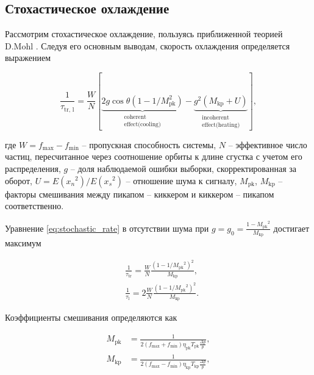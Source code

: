 	\subsection{Стохастическое охлаждение}

\par Рассмотрим стохастическое охлаждение, пользуясь приближенной теорией D.Mohl \cite{mohl:stochastic, mohl:stochastic2}. Следуя его основным выводам, скорость охлаждения определяется выражением		
	
\begin{equation} 
\frac{1}{\tau_{\text{tr, l}}}=\frac{W}{N}[\underbrace{2 g \cos \theta\left(1-1 / M_{\textrm{pk}}^2\right)}_{\begin{array}{c}
\text {coherent} \\
\text {effect(cooling)}
\end{array}}-\underbrace{g^2\left(M_{\textrm{kp}}+U\right)}_{\begin{array}{c}
\text {incoherent} \\
\text {effect(heating)}
\end{array}}],
\label{eq:stochastic_rate}
\end{equation}	

\noindent где $W=f_{\text{max}}-f_{\text{min}}$ -- пропускная способность системы, $N$ -- эффективное число частиц, пересчитанное через соотношение орбиты к длине сгустка с учетом его распределения, $g$ -- доля наблюдаемой ошибки выборки, скорректированная за оборот, $U=E({x_n}^2)/E({x_s}^2)$ -- отношение шума к сигналу, $M_{\textrm{pk}}$, $M_{\textrm{kp}}$ -- факторы смешивания между пикапом -- киккером и киккером -- пикапом соответственно.

\noindent Уравнение \ref{eq:stochastic_rate} в отсутствии шума при $g=g_0={\frac{1-{M_{\textrm{pk}}}^2}{M_{\textrm{kp}}}}$ достигает максимум

\begin{equation}
\begin{aligned}
& \frac{1}{\tau_{\textrm{tr}}}=\frac{W}{N} \frac{\left(1-1 / {M_{\textrm{pk}}}^2\right)^2}{M_{\textrm{kp}}}, \\
& \frac{1}{\tau_{\textrm{l}}}=2 \frac{W}{N} \frac{\left(1-1 / {M_{\textrm{pk}}}^2\right)^2}{M_{\textrm{kp}}}.
\end{aligned} 
\label{eq:cooling_rate}
\end{equation}

\noindent Коэффициенты смешивания определяются как

\begin{equation}
\begin{aligned}
M_{\textrm{pk}} & =\frac{1}{2\left(f_{\max }+f_{\min }\right) \eta_{\textrm{pk}} T_{\textrm{pk}} \frac{\Delta p}{p}}, \\
M_{\textrm{kp}} & =\frac{1}{2\left(f_{\max }-f_{\min }\right) \eta_{\textrm{kp}} T_{\textrm{kp}} \frac{\Delta p}{p}},
\end{aligned}
\label{eq:mixing_coeff}
\end{equation}

